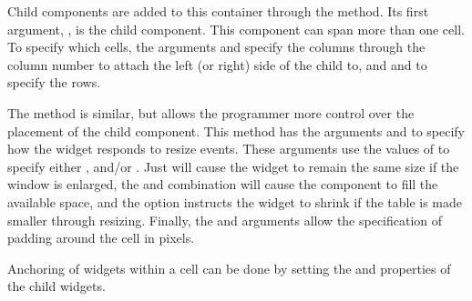 Child components are added to this container through the
 method. Its first argument,
, is the child component. This
component can span more than one cell. To specify which cells, the
arguments  and
 specify the columns through
the column number to attach the left (or right) side of the child to, and 
 and
 to specify the rows. 

The  method is similar, but allows the
programmer more control over the placement of the child
component. This method has the arguments
 and
 to specify how the widget responds
to resize events. These arguments use the values of
 to specify either ,
 and/or . Just  will cause the
widget to remain the same size if the window is enlarged, the
 and  combination will cause the component
to fill the available space, and the  option instructs
the widget to shrink if the table is made smaller through
resizing. Finally, the  and
 arguments allow the specification
of padding around the cell in pixels.


Anchoring of widgets within a cell can be done by setting the
 and  properties of the child widgets. 

